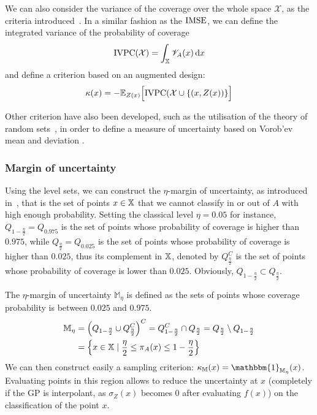 \documentclass[../../Main_ManuscritThese.tex]{subfiles}
\begin{document}
We can also consider the variance of the coverage over the whole space $\mathcal{X}$, as the criteria introduced~\cite{bect_sequential_2012}.
In a similar fashion as the $\operatorname{\mathrm{IMSE}}$, we can define the integrated variance of the probability of coverage
\begin{equation}
  \label{eq:IVPC_def}
\mathrm{IVPC}(\mathcal{X}) =  \int_{\mathbb{X}} \mathscr{V}_A(x)\,\mathrm{d}x
\end{equation}
and define a criterion based on an augmented design:
\begin{equation}
  \label{eq:expected_aIVPC}
  \kappa(x) = -\mathbb{E}_{Z(x)}\Big[\mathrm{IVPC}(\mathcal{X} \cup \{   \left(x, Z(x) \right)  \}     \Big]
\end{equation}

Other criterion have also been developed, such as the utilisation of the theory of random sets~\cite{el_amri_data-driven_2019}, in order to define a measure of uncertainty based on Vorob'ev mean and deviation \cite{vorobyev_new_2003}.


\subsubsection{Margin of uncertainty}
\label{sec:margin_of_uncertainty}

Using the level sets, we can construct the $\eta$-margin of uncertainty, as introduced in~\cite{dubourg_reliability-based_2011}, that is the set of points $x \in \mathbb{X}$ that we cannot classify in or out of $A$ with high enough probability.
Setting the classical level $\eta=0.05$ for instance, $Q_{1-\frac{\eta}{2}}=Q_{0.975}$ is the set of points whose probability of coverage is higher than $0.975$, while $Q_{\frac{\eta}{2}}=Q_{0.025}$ is the set of points whose probability of coverage is higher than $0.025$, thus its complement in $\mathbb{X}$, denoted by $Q_{\frac{\eta}{2}}^C$ is the set of points whose probability of coverage is lower than $0.025$. Obviously, $Q_{1-\frac{\eta}{2}} \subset Q_{\frac{\eta}{2}}$.

The $\eta$-margin of uncertainty $\mathbb{M}_{\eta}$ is defined as the sets of points whose coverage probability is between $0.025$ and $0.975$.
\begin{align}
  \label{eq:margin_unc}
  \mathbb{M}_{\eta} &= \left(Q_{1-\frac{\eta}{2}} \cup Q^C_{\frac{\eta}{2}} \right)^C = Q_{1-\frac{\eta}{2}}^C \cap Q_{\frac{\eta}{2}} = Q_{\frac{\eta}{2}} \setminus Q_{1-\frac{\eta}{2}} \\
                    &= \left\{x \in \mathbb{X} \mid \frac{\eta}{2} \leq \pi_A(x) \leq 1 - \frac{\eta}{2} \right\}
\end{align}
We can then construct easily a sampling criterion: $\kappa_{\mathbb{M}}(x) = \mathbbm{1}_{\mathbb{M}_{\eta}}(x)$.
Evaluating points in this region allows to reduce the uncertainty at $x$ (completely if the GP is interpolant, as $\sigma_Z(x)$ becomes $0$ after evaluating $f(x)$) on the classification of the point $x$.
\end{document}

